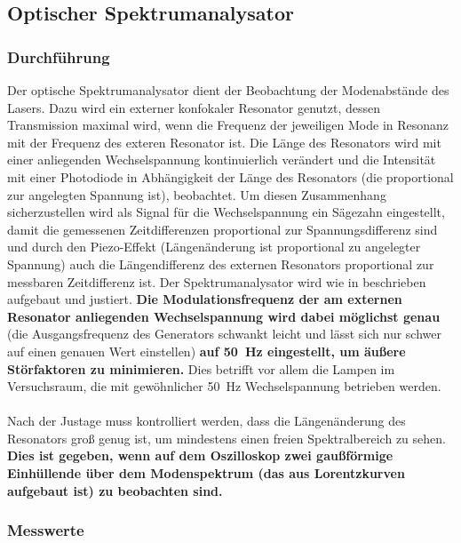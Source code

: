 \documentclass[11pt, a4paper]{article}
\numberwithin{equation}{section}
\begin{document}
\subsection{Optischer Spektrumanalysator}
\label{ssec:spektrumanalysator}

\subsubsection{Durchführung}

Der optische Spektrumanalysator dient der Beobachtung der Modenabstände des Lasers.
Dazu wird ein externer konfokaler Resonator genutzt, dessen Transmission maximal wird, wenn die Frequenz der jeweiligen Mode in Resonanz mit der Frequenz des exteren Resonator ist.
Die Länge des Resonators wird mit einer anliegenden Wechselspannung kontinuierlich verändert und die Intensität mit einer Photodiode in Abhängigkeit der Länge des Resonators (die proportional zur angelegten Spannung ist), beobachtet.
Um diesen Zusammenhang sicherzustellen wird als Signal für die Wechselspannung ein Sägezahn eingestellt, damit die gemessenen Zeitdifferenzen proportional zur Spannungsdifferenz sind und durch den Piezo-Effekt (Längenänderung ist proportional zu angelegter Spannung) auch die Längendifferenz des externen Resonators proportional zur messbaren Zeitdifferenz ist.
Der Spektrumanalysator wird wie in \cite{anleitung} beschrieben aufgebaut und justiert.
\textbf{Die Modulationsfrequenz der am externen Resonator anliegenden Wechselspannung wird dabei möglichst genau} (die Ausgangsfrequenz des Generators schwankt leicht und lässt sich nur schwer auf einen genauen Wert einstellen) \textbf{auf \SI{50}{\hertz} eingestellt, um äußere Störfaktoren zu minimieren.}
Dies betrifft vor allem die Lampen im Versuchsraum, die mit gewöhnlicher \SI{50}{\hertz} Wechselspannung betrieben werden.\\
\\
Nach der Justage muss kontrolliert werden, dass die Längenänderung des Resonators groß genug ist, um mindestens einen freien Spektralbereich zu sehen.
\textbf{Dies ist gegeben, wenn auf dem Oszilloskop zwei gaußförmige Einhüllende über dem Modenspektrum (das aus Lorentzkurven aufgebaut ist) zu beobachten sind.}

\subsubsection{Messwerte}
\end{document}
